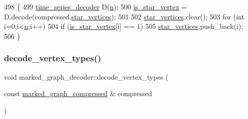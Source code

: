 \begin{DoxyCode}
498 \{
499   \hyperlink{classtime__series__decoder}{time\_series\_decoder} D(\hyperlink{classmarked__graph__decoder_aefc93611bc4a3e9a5d3956d97649a0e9}{n});
500   \hyperlink{classmarked__graph__decoder_a5c5391206cf2965b8513248e505ba48f}{is\_star\_vertex} = D.decode(compressed.\hyperlink{classmarked__graph__compressed_a7a4ced4586e2e353f9076bd447df5208}{star\_vertices});
501 
502   \hyperlink{classmarked__graph__decoder_a06fc05827db14b675f7ecc2fd915b533}{star\_vertices}.clear();
503   \textcolor{keywordflow}{for} (\textcolor{keywordtype}{int} i=0;i<\hyperlink{classmarked__graph__decoder_aefc93611bc4a3e9a5d3956d97649a0e9}{n};i++)
504     \textcolor{keywordflow}{if} (\hyperlink{classmarked__graph__decoder_a5c5391206cf2965b8513248e505ba48f}{is\_star\_vertex}[i] == 1)
505       \hyperlink{classmarked__graph__decoder_a06fc05827db14b675f7ecc2fd915b533}{star\_vertices}.push\_back(i);
506 \}
\end{DoxyCode}
\mbox{\label{classmarked__graph__decoder_afc0aea714483a4dda31dd85fd20bfe5f}} 
\subsubsection{\texorpdfstring{decode\+\_\+vertex\+\_\+types()}{decode\_vertex\_types()}}
{\footnotesize\ttfamily void marked\+\_\+graph\+\_\+decoder\+::decode\+\_\+vertex\+\_\+types (\begin{DoxyParamCaption}\item[{const \hyperlink{classmarked__graph__compressed}{marked\+\_\+graph\+\_\+compressed} \&}]{compressed }\end{DoxyParamCaption})\hspace{0.3cm}{\ttfamily [private]}}


